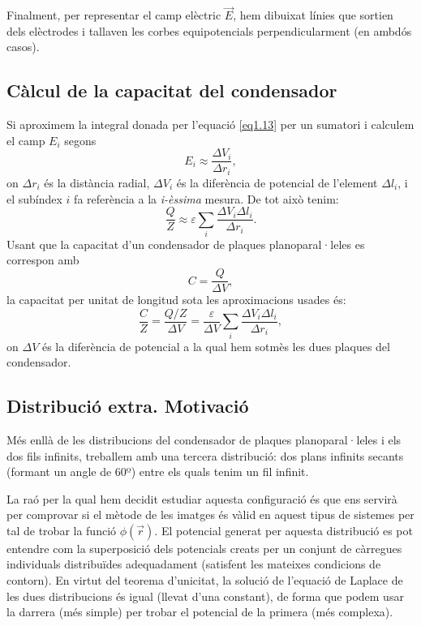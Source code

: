\documentclass[a4paper,10.5pt]{report}
\begin{document}
Finalment, per representar el camp elèctric $\vec{E}$, hem dibuixat línies que sortien dels elèctrodes i tallaven les corbes equipotencials perpendicularment (en ambdós casos). 

\subsection{Càlcul de la capacitat del condensador}
Si aproximem la integral donada per l'equació \eqref{eq1.13} per un sumatori i calculem el camp $E_i$ segons
\begin{equation}
	E_i \approx \frac{\Delta V_i}{\Delta r_i} \label{eq1.14},
\end{equation}
on $\Delta r_i$ és la distància radial, $\Delta V_i$ és la diferència de potencial de l'element $\Delta l_i$, i el subíndex $i$ fa referència a la \textit{i-èssima} mesura. De tot això tenim:
\begin{equation}
	\frac{Q}{Z} \approx \varepsilon \sum_i \frac{\Delta V_i \Delta l_i}{\Delta r_i}.
\end{equation}
Usant que la capacitat d'un condensador de plaques planoparal·leles es correspon amb 
\begin{equation}
	C = \frac{Q}{\Delta V},
\end{equation}
la capacitat per unitat de longitud sota les aproximacions usades és:
\begin{equation}
	\frac{C}{Z} = \frac{Q/Z}{\Delta V} = \frac{\varepsilon}{\Delta V} \sum_i \frac{\Delta V_i \Delta l_i}{\Delta r_i} \label{eq1.17},
\end{equation}
on $\Delta V$ és la diferència de potencial a la qual hem sotmès les dues plaques del condensador.

\subsection{Distribució extra. Motivació}
Més enllà de les distribucions del condensador de plaques planoparal·leles i els dos fils infinits, treballem amb una tercera distribució: dos plans infinits secants (formant un angle de 60º) entre els quals tenim un fil infinit.

La raó per la qual hem decidit estudiar aquesta configuració és que ens servirà per comprovar si el mètode de les imatges és vàlid en aquest tipus de sistemes per tal de trobar la funció $\phi(\vec{r})$. El potencial generat per aquesta distribució es pot entendre com la superposició dels potencials creats per un conjunt de càrregues individuals distribuïdes adequadament (satisfent les mateixes condicions de contorn). En virtut del teorema d'unicitat, la solució de l'equació de Laplace de les dues distribucions és igual (llevat d'una constant), de forma que podem usar la darrera (més simple) per trobar el potencial de la primera (més complexa). 
\end{document}
